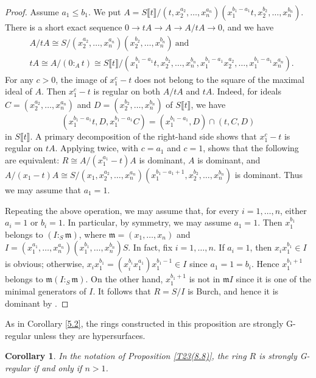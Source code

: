 \documentclass{amsart}
\newtheorem{cor}[thm]{Corollary}
\theoremstyle{definition}
\theoremstyle{remark}
\numberwithin{equation}{thm}
\def\le{\leqslant}
\def\m{\mathfrak{m}}
\begin{document}
\begin{proof}
Assume $a_1\le b_1$. We put $A=S\llbracket t\rrbracket/(t,x_2^{a_2},\ldots,x_n^{a_n})(x_1^{b_1-a_1}t, x_2^{b_2},\ldots,x_n^{b_n})$. There is a short exact sequence $0\to tA\to A\to A/tA\to 0$, and we have
\begin{align*}
&A/tA\cong S/(x_2^{a_2},\ldots,x_n^{a_n})(x_2^{b_2},\ldots,x_n^{b_n}) \ \text{and} \\
& tA\cong A/(0:_A t)\cong S\llbracket t\rrbracket/(x_1^{b_1-a_1}t, x_2^{b_2},\ldots,x_n^{b_n}, x_1^{b_1-a_1}x_2^{a_2},\ldots, x_1^{b_1-a_1}x_n^{a_n}).
\end{align*}
For any $c>0$, the image of $x_1^c-t$ does not belong to the square of the maximal ideal of $A$.
Then $x_1^c-t$ is regular on both $A/tA$ and $tA$. Indeed, for ideals $C=(x_2^{a_2},\ldots,x_n^{a_n})$ and $D=(x_2^{b_2},\ldots,x_n^{b_n})$ of $S\llbracket t\rrbracket$, we have 
$$(x_1^{b_1-a_1}t, D, x_1^{b_1-a_1}C)=(x_1^{b_1-a_1}, D) \cap (t, C, D)$$
in $S\llbracket t\rrbracket$. 
A primary decomposition of the right-hand side shows that $x_1^c-t$ is regular on $tA$.
Applying \cite[Theorem 5.6]{T23} twice, with $c=a_1$ and $c=1$, shows that the following are equivalent: $R\cong A/(x_1^{a_1}-t)A$ is dominant, $A$ is dominant, and $A/(x_1-t)A\cong S/(x_1,x_2^{a_2},\ldots,x_n^{a_n})(x_1^{b_1-a_1+1},x_2^{b_2},\ldots,x_n^{b_n})$ is dominant. Thus we may assume that $a_1=1$.

Repeating the above operation, we may assume that, for every $i=1,\ldots,n$, either $a_i=1$ or $b_i=1$. In particular, by symmetry, we may assume $a_1=1$. Then $x_1^{b_1}$ belongs to $(I:_S \m)$, where $\m=(x_1,\ldots,x_n)$ and $I=(x_1^{a_1},\ldots,x_n^{a_n})(x_1^{b_1},\ldots,x_n^{b_n})S$. In fact, fix $i=1,\ldots,n$. If $a_i=1$, then $x_ix_1^{b_1} \in I$ is obvious; otherwise, $x_ix_1^{b_1}=(x_i^{b_i}x_1^{a_1})x_1^{b_1-1}\in I$ since $a_1=1=b_i$. Hence $x_1^{b_1+1}$ belongs to $\m(I:_S \m)$. On the other hand, $x_1^{b_1+1}$ is not in $\m I$ since it is one of the minimal generators of $I$. It follows that $R=S/I$ is Burch, and hence it is dominant by \cite[Proposition 5.10]{T23}.
\end{proof}

As in Corollary \ref{5.2}, the rings constructed in this proposition are strongly G-regular unless they are hypersurfaces.

\begin{cor}
In the notation of Proposition \ref{T23(8.8)}, the ring $R$ is strongly G-regular if and only if $n>1$.
\end{cor}
\end{document}
